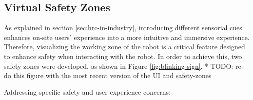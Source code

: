 
\subsection{Virtual Safety Zones}
\label{subsection:virtual-safety-zones} 

As explained in section \ref{sec:hrc-in-industry}, introducing different sensorial cues enhances on-site users' experience into a more intuitive and immersive experience. Therefore, visualizing the working zone of the robot is a critical feature designed to enhance safety when interacting with the robot. In order to achieve this, two safety zones were developed, as shown in Figure \ref{fig:blinking-sign}. 
* TODO: re-do this figure with the most recent version of the UI and safety-zones


Addressing specific safety and user experience concerns: 

